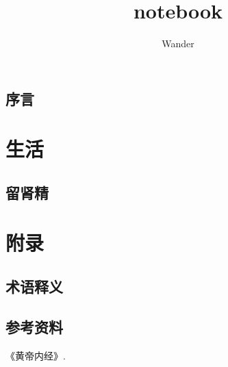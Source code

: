 \documentclass[12pt,oneside]{book}
\title{notebook}
\author{Wander}
\begin{document}
\makemytitleA



\frontmatter 
{}
\chapter*{序言}


\setcounter{tocdepth}{2}    
\tableofcontents



\mainmatter



\part{生活}



\chapter{留肾精}


\appendix
\part{附录}
\chapter{术语释义}



\backmatter
\chapter*{参考资料}
\begin{thebibliography}{99}
 《黄帝内经》.


\end{thebibliography}
\end{document}
